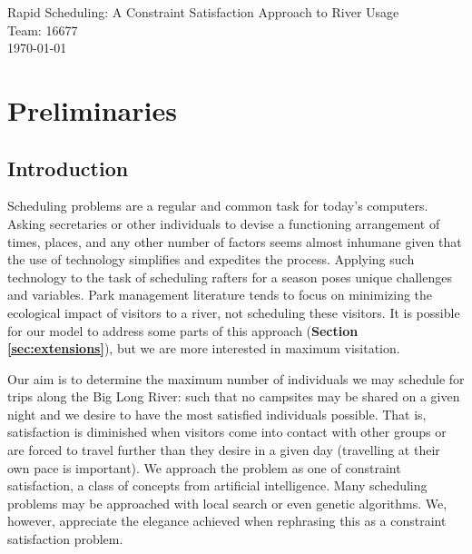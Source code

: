 \documentclass[11pt]{article} %
\begin{document}
\begin{titlepage}
    \vspace*{\fill}
    \begin{center}
      \Huge{Rapid Scheduling: A Constraint Satisfaction
        Approach to River Usage}\\[0.5cm]
      \Large{Team: 16677}\\[0.4cm]
      \today
    \end{center}
    \vspace*{\fill}
  \end{titlepage}
\newpage
\vspace*{\fill}
\tableofcontents
\vspace*{\fill}
\newpage

\section{Preliminaries}
\label{sec:prelims}

\subsection{Introduction}
\label{sec:intro}
Scheduling problems are a regular and common task for today's computers.
Asking secretaries or other individuals to devise a functioning arrangement
of times, places, and any other number of factors seems almost inhumane given
that the use of technology simplifies and expedites the process.  Applying
such technology to the task of scheduling rafters for a season poses unique
challenges and variables.  Park management literature tends to focus
on minimizing the ecological impact of visitors to a river,
not scheduling these visitors\cite{ColoradoRiverPaper}.  It is possible for
our model to address some parts of this approach
(\textbf{Section \ref{sec:extensions}}), but we are more interested in
maximum visitation.

Our aim is to determine the maximum number of individuals we may schedule
for trips along the Big Long River: such that no campsites may be shared
on a given night and we desire to have the most satisfied individuals possible.
That is, satisfaction is diminished when visitors come into contact with other
groups or are forced to travel further than they desire in a given day
(travelling at their own pace is important).  We approach the problem as
one of constraint satisfaction, a class of concepts from artificial intelligence.
Many scheduling problems may be approached with local search or even genetic
algorithms.  We, however, appreciate the elegance achieved when
rephrasing this as a constraint satisfaction problem.
\end{document}
